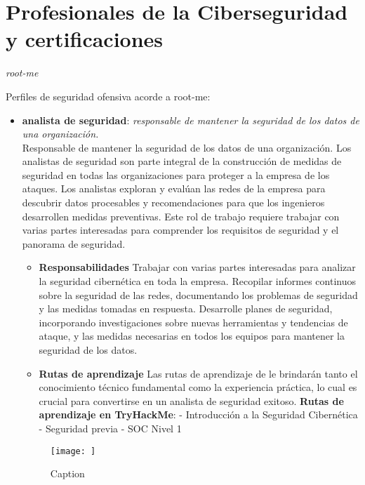 
\chapter{Profesionales de la Ciberseguridad y certificaciones}
\vspace{95px}


\begin{flushright}
    \textit{root-me}
\end{flushright}


Perfiles de seguridad ofensiva acorde a root-me: 
\begin{itemize}
\item  \textbf{analista de seguridad}: \textit{responsable de mantener la seguridad de los datos de una organización.}\\
Responsable de mantener la seguridad de los datos de una organización.
%
Los analistas de seguridad son parte integral de la construcción de medidas de seguridad en todas las organizaciones para proteger a la empresa de los ataques. Los analistas exploran y evalúan las redes de la empresa para descubrir datos procesables y recomendaciones para que los ingenieros desarrollen medidas preventivas. Este rol de trabajo requiere trabajar con varias partes interesadas para comprender los requisitos de seguridad y el panorama de seguridad.\\
%
\begin{itemize}
    \item \textbf{Responsabilidades}
Trabajar con varias partes interesadas para analizar la seguridad cibernética en toda la empresa.
Recopilar informes continuos sobre la seguridad de las redes, documentando los problemas de seguridad y las medidas tomadas en respuesta.
Desarrolle planes de seguridad, incorporando investigaciones sobre nuevas herramientas y tendencias de ataque, y las medidas necesarias en todos los equipos para mantener la seguridad de los datos.
\item \textbf{Rutas de aprendizaje}
Las rutas de aprendizaje de  le brindarán tanto el conocimiento técnico fundamental como la experiencia práctica, lo cual es crucial para convertirse en un analista de seguridad exitoso.
\textbf{Rutas de aprendizaje en TryHackMe}:
- Introducción a la Seguridad Cibernética
- Seguridad previa
- SOC Nivel 1
\end{itemize}


\begin{figure}
    \centering
    \texttt{[image: ]}
    \caption{Caption}
    \label{fig:enter-label}
\end{figure}




\end{itemize}

